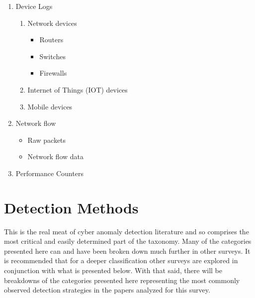 \documentclass[conference]{IEEEtran}
\begin{document}
\begin{enumerate}
    \item Device Logs\cite{horne2002management}
    \begin{enumerate}
        \item Network devices
        \begin{itemize}
            \item Routers
            \item Switches
            \item Firewalls
        \end{itemize}
        \item Internet of Things (IOT) devices
        \item Mobile devices
    \end{enumerate}
    \item Network flow \cite{kim2013detection}
    \begin{itemize}
        \item Raw packets
        \item Network flow data
    \end{itemize}
    \item Performance Counters
\end{enumerate}

\section{Detection Methods}
This is the real meat of cyber anomaly detection literature and so comprises the most critical and easily determined part of the taxonomy. Many of the categories presented here can and have been broken down much further in other surveys. It is recommended that for a deeper classification other surveys are explored in conjunction with what is presented below. With that said, there will be breakdowns of the categories presented here representing the most commonly observed detection strategies in the papers analyzed for this survey.
\end{document}

